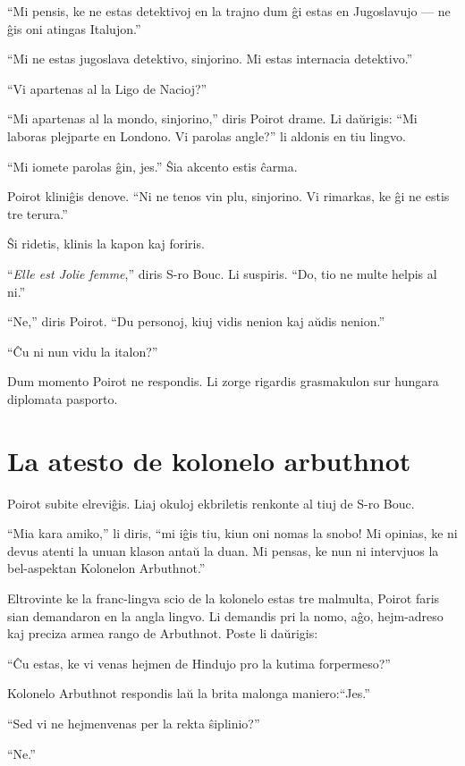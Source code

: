 ``Mi pensis, ke ne estas detektivoj en la trajno dum ĝi estas en Jugoslavujo --- ne ĝis oni atingas Italujon.''

``Mi ne estas jugoslava detektivo, sinjorino. Mi estas internacia detektivo.''

``Vi apartenas al la Ligo de Nacioj?''

``Mi apartenas al la mondo, sinjorino,'' diris Poirot drame. Li daŭrigis: ``Mi laboras plejparte en Londono. Vi parolas angle?'' li aldonis en tiu lingvo.

``Mi iomete parolas ĝin, jes.'' Ŝia akcento estis ĉarma.

Poirot kliniĝis denove. ``Ni ne tenos vin plu, sinjorino. Vi rimarkas, ke ĝi ne estis tre terura.''

Ŝi ridetis, klinis la kapon kaj foriris.

``\emph{Elle est Jolie femme},'' diris S-ro Bouc. Li suspiris. ``Do, tio ne multe helpis al ni.''

``Ne,'' diris Poirot. ``Du personoj, kiuj vidis nenion kaj aŭdis nenion.''

``Ĉu ni nun vidu la italon?''

Dum momento Poirot ne respondis. Li zorge rigardis grasmakulon sur hungara diplomata pasporto.

\chapter[La atesto de kolonelo arbuthnot]{La atesto de kolonelo arbuthnot}


Poirot subite elreviĝis. Liaj okuloj ekbriletis renkonte al tiuj de S-ro Bouc.

``Mia kara amiko,'' li diris, ``mi iĝis tiu, kiun oni nomas la snobo! Mi opinias, ke ni devus atenti la unuan klason antaŭ la duan. Mi pensas, ke nun ni intervjuos la bel-aspektan Kolonelon Arbuthnot.''

Eltrovinte ke la franc-lingva scio de la kolonelo estas tre malmulta, Poirot faris sian demandaron en la angla lingvo. Li demandis pri la nomo, aĝo, hejm-adreso kaj preciza armea rango de Arbuthnot. Poste li daŭrigis:

``Ĉu estas, ke vi venas hejmen de Hindujo pro la kutima forpermeso?''

Kolonelo Arbuthnot respondis laŭ la brita malonga maniero:``Jes.''

``Sed vi ne hejmenvenas per la rekta ŝiplinio?''

``Ne.''

